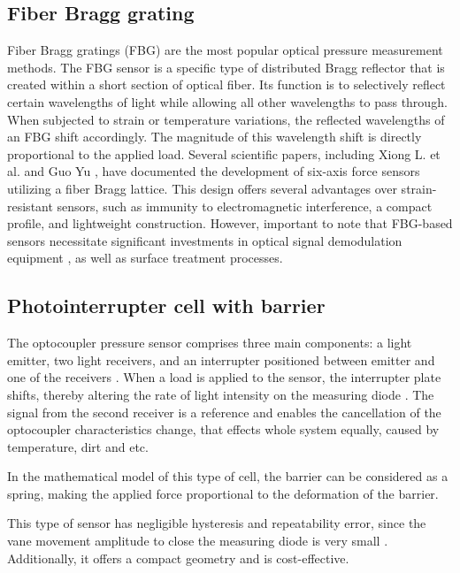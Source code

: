 \subsection{Fiber Bragg grating}
Fiber Bragg gratings (FBG) are the most popular optical pressure measurement methods. The FBG sensor is a specific type 
of distributed Bragg reflector that is created within a short section of optical fiber. 
Its function is to selectively reflect certain wavelengths of light while allowing all other wavelengths to pass through. 
When subjected to strain or temperature variations, the reflected wavelengths of an FBG shift accordingly. 
The magnitude of this wavelength shift is directly proportional to the applied load.
Several scientific papers, including Xiong L. et al. \cite{3d_FBG_sensor} and Guo Yu \cite{fingertip_based_FBG}, 
have documented the development of six-axis force sensors utilizing a fiber Bragg lattice. 
This design offers several advantages over strain-resistant sensors, such as immunity to electromagnetic interference, 
a compact profile, and lightweight construction. However, important to note that FBG-based sensors 
necessitate significant investments in optical signal demodulation equipment \cite{3d_FBG_sensor}, 
as well as surface treatment processes.

\subsection{Photointerrupter cell with barrier}

The optocoupler pressure sensor comprises three main components: a light emitter, two light receivers, and an interrupter positioned between emitter and one of the receivers \cite{my_love_pressure_photosensor}. 
When a load is applied to the sensor, the interrupter plate shifts, thereby altering the rate of light intensity on the measuring diode \cite{1990_optic}.
The signal from the second receiver is a reference and enables the cancellation of the optocoupler characteristics change, that effects whole system equally, caused by temperature, dirt and etc.

In the mathematical model of this type of cell, the barrier can be considered as a spring, making the applied force proportional to the deformation of the barrier.

This type of sensor has negligible hysteresis and repeatability error, since the vane movement amplitude to close the measuring diode is very small \cite*{pressure_sens_calibration_stat_dyn}.
Additionally, it offers a compact geometry and is cost-effective. %

